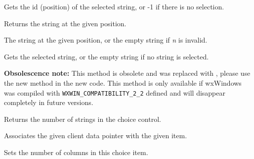
Gets the id (position) of the selected string, or -1 if there is no selection.

\label{wxchoicegetstring}


Returns the string at the given position.




The string at the given position, or the empty string if {\it n} is invalid.

\label{wxchoicegetstringselection}


Gets the selected string, or the empty string if no string is selected.

\label{wxchoicenumber}


{\bf Obsolescence note:} This method is obsolete and was replaced with 
, please use the new method in the new
code. This method is only available if wxWindows was compiled with 
{\tt WXWIN\_COMPATIBILITY\_2\_2} defined and will disappear completely in
future versions.

Returns the number of strings in the choice control.

\label{wxchoicesetclientdata}


Associates the given client data pointer with the given item.




\label{wxchoicesetcolumns}


Sets the number of columns in this choice item.


